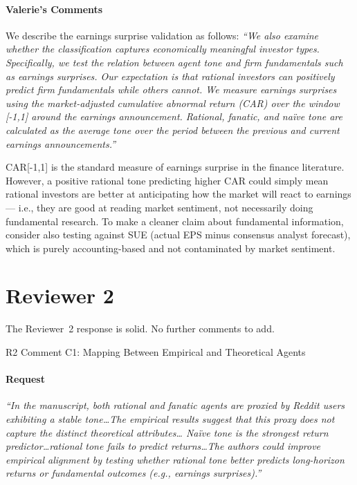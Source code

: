 \documentclass[11pt]{article}
\makeatletter
\def\section{\@ifstar\section@star\section@nostar}
\def\section@star#1{%
  \par\vspace{1.5ex}%
  \noindent{\normalsize\bfseries#1}\par%
  \vspace{0.5ex}%
  \@afterheading%
}
\def\section@nostar#1{%
  \par\vspace{1.5ex}%
  \noindent{%
    \setlength{\fboxsep}{4pt}%
    \colorbox{sectionbg}{\parbox{\dimexpr\textwidth-8pt\relax}{\normalsize\bfseries\strut#1\strut}}%
  }\par%
  \vspace{0.5ex}%
  \@afterheading%
}
\makeatother
\begin{document}
\subsection*{Valerie's Comments}
We describe the earnings surprise validation as follows:
\textit{``We also examine whether the classification captures economically
meaningful investor types. Specifically, we test the relation between agent
tone and firm fundamentals such as earnings surprises. Our expectation is
that rational investors can positively predict firm fundamentals while others
cannot. We measure earnings surprises using the market-adjusted cumulative
abnormal return (CAR) over the window [-1,1] around the earnings
announcement. Rational, fanatic, and na\"{i}ve tone are calculated as the
average tone over the period between the previous and current earnings
announcements.''}

CAR[-1,1] is the standard measure of earnings surprise in the finance
literature. However, a positive rational tone predicting higher CAR could
simply mean rational investors are better at anticipating how the market will
react to earnings --- i.e., they are good at reading market sentiment, not
necessarily doing fundamental research. To make a cleaner claim about
fundamental information, consider also testing against SUE (actual EPS minus
consensus analyst forecast), which is purely accounting-based and not
contaminated by market sentiment.


\newpage
\part{Reviewer 2}

The Reviewer~2 response is solid. No further comments to add.

\section{R2 Comment C1: Mapping Between Empirical and Theoretical Agents}

\subsection*{Request}
\begin{mdframed}
\textit{``In the manuscript, both rational and fanatic agents are proxied
by Reddit users exhibiting a stable tone\ldots The empirical results suggest
that this proxy does not capture the distinct theoretical attributes\ldots
Na\"{i}ve tone is the strongest return predictor\ldots rational tone fails
to predict returns\ldots The authors could improve empirical alignment by
testing whether rational tone better predicts long-horizon returns or
fundamental outcomes (e.g., earnings surprises).''}
\end{mdframed}
\end{document}
